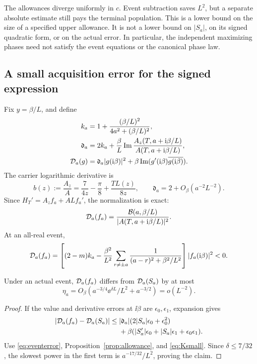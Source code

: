 The allowances diverge uniformly in \(c\). Event subtraction saves
\(L^2\), but a separate absolute estimate still pays the terminal
population. This is a lower bound on the size of a specified upper
allowance. It is not a lower bound on \(|S_a|\), on its signed quadratic
form, or on the actual error. In particular, the independent maximizing
phases need not satisfy the event equations or the canonical phase law.

\subsection{A small acquisition error for the signed expression}

Fix \(y=\beta/L\), and define
\begin{align}
 k_a&=1+\frac{(\beta/L)^2}{4a^2+(\beta/L)^2},\\
 \mathfrak d_a&=2k_a+\frac\beta L
              \operatorname{Im}\frac{A_z(T,a+\mathrm i\beta/L)}{A(T,a+\mathrm i\beta/L)},\\
 \mathcal D_a(g)&=\mathfrak d_a|g(\mathrm i\beta)|^2
                   +\beta\operatorname{Im}(g'(\mathrm i\beta)\overline{g(\mathrm i\beta)}).
 \label{eq:D}
\end{align}
The carrier logarithmic derivative is
\begin{equation}\label{eq:bcarrier}
 b(z):=\frac{A_z}{A}=\frac7{4z}-\frac\pi8+\frac{TL(z)}{8z},
 \qquad \mathfrak d_a=2+O_\beta(a^{-2}L^{-2}).
\end{equation}
Since \(H_T'=A_zf_a+ALf_a'\), the normalization is exact:
\begin{equation}\label{eq:physicalD}
 \mathcal D_a(f_a)=\frac{\mathcal B(a,\beta/L)}{|A(T,a+\mathrm i\beta/L)|^2}.
\end{equation}
At an all-real event,
\begin{equation}\label{eq:physicalDnegative}
 \mathcal D_a(f_a)=
 \left[(2-m)k_a-\frac{\beta^2}{L^2}
  \sum_{r\ne\pm a}\frac1{(a-r)^2+\beta^2/L^2}\right]|f_a(\mathrm i\beta)|^2<0.
\end{equation}

\begin{proposition}\label{prop:Derror}
Under an actual event, \(\mathcal D_a(f_a)\) differs from
\(\mathcal D_a(S_a)\) by at most
\begin{equation}\label{eq:eta}
 \eta_a=O_\beta\left(
       a^{-3/4}\ee^{\delta L}/L^2+a^{-3/2}\right)
       =o(L^{-2}).
\end{equation}
\end{proposition}
\begin{proof}
If the value and derivative errors at \(\ii\beta\) are
\(\epsilon_0,\epsilon_1\), expansion gives
\begin{align*}
 |\mathcal D_a(f_a)-\mathcal D_a(S_a)|
 \le{}&|\mathfrak d_a|(2|S_a|\epsilon_0+\epsilon_0^2)\\
 &+\beta(|S_a'|\epsilon_0+|S_a|\epsilon_1+\epsilon_0\epsilon_1).
\end{align*}
Use \eqref{eq:eventerror}, Proposition~\ref{prop:allowance}, and
\eqref{eq:Ksmall}. Since \(\delta\le7/32\), the slowest power in the
first term is \(a^{-17/32}/L^2\), proving the claim.
\end{proof}

